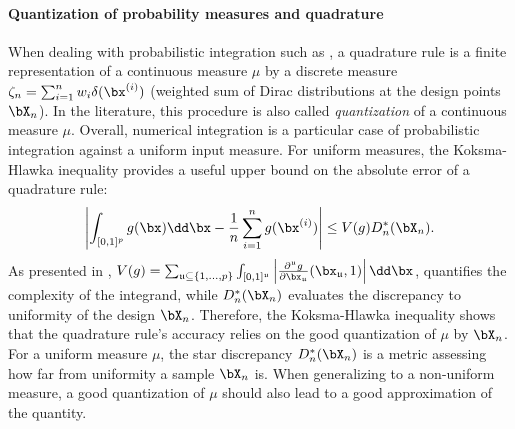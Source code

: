 \paragraph{Quantization of probability measures and quadrature}
When dealing with probabilistic integration such as , a quadrature rule is a finite representation of a continuous measure $\mu$ by a discrete measure $\zeta_n = \sum_{i=1}^n w_i \delta(\bx^{(i)})$ (weighted sum of Dirac distributions at the design points $\bX_n$).
In the literature, this procedure is also called \emph{quantization} of a continuous measure $\mu$. 
Overall, numerical integration is a particular case of probabilistic integration against a uniform input measure. 
For uniform measures, the Koksma-Hlawka inequality \citep{morokoff_1995} provides a useful upper bound on the absolute error of a quadrature rule: 
\begin{equation}
    \left| \int_{[0, 1]^p} g(\bx) \dd \bx - \frac1n \sum_{i=1}^n g(\bx^{(i)})\right| \leq  V(g) D_n^*(\bX_n).
    \label{eq:KH_inequality}
\end{equation}
As presented in \cite{oates_21}, $V(g) = \sum_{\mathfrak{u}\subseteq\{1, \dots, p \}} \int_{[0, 1]^\mathfrak{u}} \left| \frac{\partial^{\mathfrak{u}}g}{\partial \bx_{\mathfrak{u}}}(\bx_{\mathfrak{u}}, 1)\right| \dd\bx$, quantifies the complexity of the integrand, 
while $D_n^*(\bX_n)$ evaluates the discrepancy to uniformity of the design $\bX_n$. 
Therefore, the Koksma-Hlawka inequality shows that the quadrature rule's accuracy relies on the good quantization of $\mu$ by $\bX_n$. 
For a uniform measure $\mu$, the star discrepancy $D_n^*(\bX_n)$ is a metric assessing how far from uniformity a sample $\bX_n$ is. 
When generalizing to a non-uniform measure, a good quantization of $\mu$ should also lead to a good approximation of the quantity. 


